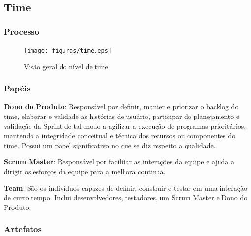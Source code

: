 \subsection{Time}
  \subsubsection{Processo}

  \begin{figure}[H]
      \centering
    \texttt{[image: figuras/time.eps]}
      \caption{Visão geral do nível de time.}
      \label{fig:time}
  \end{figure}

  \subsubsection{Papéis}

\textbf{Dono do Produto}: Responsável por definir, manter e priorizar o backlog do time,
elaborar e validade as histórias de usuário, participar do planejamento e validação
da Sprint de tal modo a agilizar a execução de programas prioritários, mantendo a
integridade conceitual e técnica dos recursos ou componentes do time. Possui um papel
significativo no que se diz respeito a qualidade.

\textbf{Scrum Master}: Responsável por facilitar as interações da equipe e ajuda
a dirigir os esforços da equipe para a melhora continua.

\textbf{Team}: São os indivíduos capazes de definir, construir e testar em uma interação
de curto tempo. Inclui desenvolvedores, testadores, um Scrum Master e Dono do Produto.

  \subsubsection{Artefatos}

